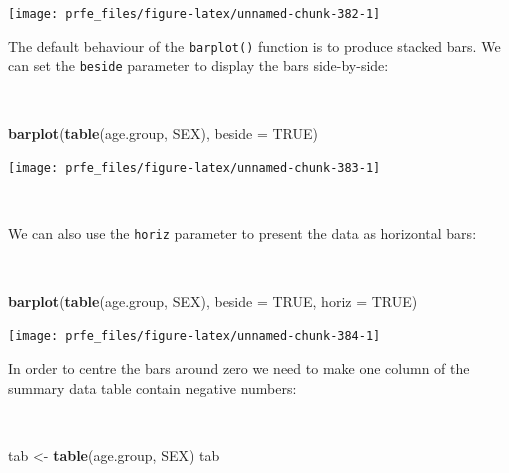 \documentclass[12pt,a4paper]{book}
\newenvironment{Shaded}{\begin{snugshade}}{\end{snugshade}}
\newcommand{\DataTypeTok}[1]{\textcolor[rgb]{0.13,0.29,0.53}{#1}}
\newcommand{\KeywordTok}[1]{\textcolor[rgb]{0.13,0.29,0.53}{\textbf{#1}}}
\newcommand{\NormalTok}[1]{#1}
\newcommand{\OtherTok}[1]{\textcolor[rgb]{0.56,0.35,0.01}{#1}}
\newcommand{\StringTok}[1]{\textcolor[rgb]{0.31,0.60,0.02}{#1}}
\theoremstyle{definition}
\theoremstyle{definition}
\theoremstyle{definition}
\theoremstyle{remark}
\begin{document}
\begin{center}\texttt{[image: prfe\_files/figure-latex/unnamed-chunk-382-1]} \end{center}

\newpage

The default behaviour of the \texttt{barplot()} function is to produce
stacked bars. We can set the \texttt{beside} parameter to display the
bars side-by-side:

~

\begin{Shaded}
\begin{Highlighting}[]
\KeywordTok{barplot}\NormalTok{(}\KeywordTok{table}\NormalTok{(age.group, SEX), }\DataTypeTok{beside =} \OtherTok{TRUE}\NormalTok{)}
\end{Highlighting}
\end{Shaded}

\begin{center}\texttt{[image: prfe\_files/figure-latex/unnamed-chunk-383-1]} \end{center}

~

We can also use the \texttt{horiz} parameter to present the data as
horizontal bars:

~

\begin{Shaded}
\begin{Highlighting}[]
\KeywordTok{barplot}\NormalTok{(}\KeywordTok{table}\NormalTok{(age.group, SEX), }\DataTypeTok{beside =} \OtherTok{TRUE}\NormalTok{, }\DataTypeTok{horiz =} \OtherTok{TRUE}\NormalTok{)}
\end{Highlighting}
\end{Shaded}

\begin{center}\texttt{[image: prfe\_files/figure-latex/unnamed-chunk-384-1]} \end{center}

\newpage

In order to centre the bars around zero we need to make one column of
the summary data table contain negative numbers:

~

\begin{Shaded}
\begin{Highlighting}[]
\NormalTok{tab <-}\StringTok{ }\KeywordTok{table}\NormalTok{(age.group, SEX)}
\NormalTok{tab}
\end{Highlighting}
\end{Shaded}
\end{document}
